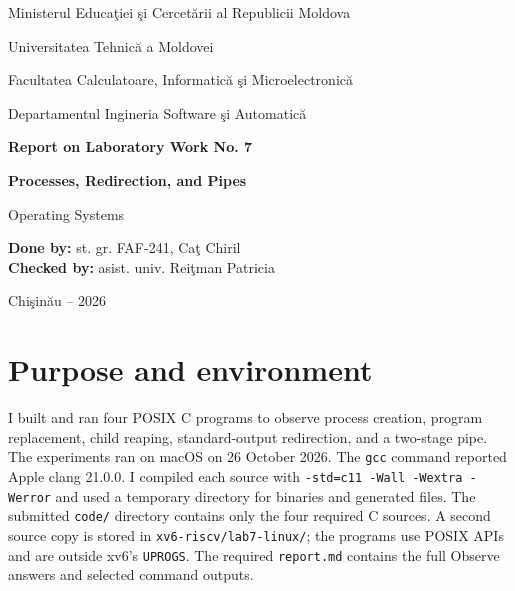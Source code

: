 \documentclass[12pt]{article}
\begin{document}
\begin{titlepage}
\centering
{\large Ministerul Educa\c{t}iei \c{s}i Cercet\u{a}rii al Republicii Moldova\par}
\vspace{0.45cm}
{\large Universitatea Tehnic\u{a} a Moldovei\par}
\vspace{0.45cm}
{\large Facultatea Calculatoare, Informatic\u{a} \c{s}i Microelectronic\u{a}\par}
\vspace{0.45cm}
{\large Departamentul Ingineria Software \c{s}i Automatic\u{a}\par}
\vspace{3cm}
{\Large\bfseries Report on Laboratory Work No. 7\par}
\vspace{0.55cm}
{\LARGE\bfseries Processes, Redirection, and Pipes\par}
\vspace{0.35cm}
{\large Operating Systems\par}
\vfill
\begin{flushleft}
\textbf{Done by:} st. gr. FAF-241, Ca\c{t} Chiril\\[0.8cm]
\textbf{Checked by:} asist. univ. Rei\c{t}man Patricia
\end{flushleft}
\vfill
{Chi\c{s}in\u{a}u -- 2026\par}
\end{titlepage}

\tableofcontents
\clearpage
{}

\section{Purpose and environment}
I built and ran four POSIX C programs to observe process creation, program
replacement, child reaping, standard-output redirection, and a two-stage pipe.
The experiments ran on macOS on 26 October 2026. The \texttt{gcc} command
reported Apple clang 21.0.0. I compiled each source with
\texttt{-std=c11 -Wall -Wextra -Werror} and used a temporary directory for
binaries and generated files. The submitted \texttt{code/} directory contains
only the four required C sources. A second source copy is stored in
\texttt{xv6-riscv/lab7-linux/}; the programs use POSIX APIs and are outside
xv6's \texttt{UPROGS}. The required \texttt{report.md} contains the full
Observe answers and selected command outputs.
\end{document}
